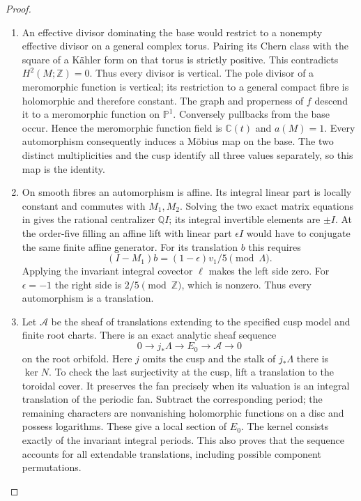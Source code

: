 \documentclass[11pt,a4paper]{article}
\theoremstyle{definition}
\begin{document}
\begin{proof}
\begin{enumerate}[label=\arabic*.]
\item An effective divisor dominating the base would restrict to
a nonempty effective divisor on a general complex torus.
Pairing its Chern class with the square of a Kähler form
on that torus is strictly positive. This contradicts
$H^2(M;\mathbb Z)=0$. Thus every divisor is vertical.
The pole divisor of a meromorphic function is vertical;
its restriction to a general compact fibre is holomorphic
and therefore constant. The graph and properness of $f$
descend it to a meromorphic function on $\mathbb P^1$.
Conversely pullbacks from the base occur. Hence the
meromorphic function field is $\mathbb C(t)$ and $a(M)=1$.
Every automorphism consequently induces a Möbius map on
the base. The two distinct multiplicities and the cusp
identify all three values separately, so this map is the
identity.

\item On smooth fibres an automorphism is affine. Its integral
linear part is locally constant and commutes with $M_1,M_2$.
Solving the two exact matrix equations in
 gives the rational
centralizer $\mathbb Q I$; its integral invertible elements
are $\pm I$. At the order-five filling an affine lift with
linear part $\epsilon I$ would have to conjugate the same
finite affine generator. For its translation $b$ this
requires
\[
(I-M_1)b=(1-\epsilon)v_1/5\pmod\Lambda.
\]
Applying the invariant integral covector $\ell$ makes the
left side zero. For $\epsilon=-1$ the right side is
$2/5\pmod\mathbb Z$, which is nonzero. Thus every
automorphism is a translation.

\item Let $\mathcal A$ be the sheaf of translations extending to
the specified cusp model and finite root charts. There is
an exact analytic sheaf sequence
\[
0\to j_*\Lambda\to E_0\to\mathcal A\to0
\]
on the root orbifold. Here $j$ omits the cusp and the stalk
of $j_*\Lambda$ there is $\ker N$.
To check the last surjectivity at the cusp, lift a translation
to the toroidal cover. It preserves the fan precisely when
its valuation is an integral translation of the periodic
fan. Subtract the corresponding period; the remaining
characters are nonvanishing holomorphic functions on a
disc and possess logarithms. These give a local section
of $E_0$. The kernel consists exactly of the invariant
integral periods. This also proves that the sequence
accounts for all extendable translations, including
possible component permutations.


\end{enumerate}
\end{proof}
\end{document}
